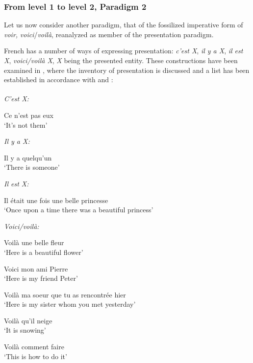 \documentclass[output=paper]{langsci/langscibook}
\begin{document}
\subsubsection{From level 1 to level 2, Paradigm 2} \label{kragh:4.1.2}


Let us now consider another paradigm, that of the fossilized imperative form of \textit{voir,} \textit{voici}/\textit{voilà}, reanalyzed as member of the presentation paradigm.  

French has a number of ways of expressing presentation: \textit{c’est X}, \textit{il y a X}, \textit{il est X}, \textit{voici/voilà X}, \textit{X} being the presented entity. These constructions have been examined in \citet{KraghSchosler2019}, where the inventory of presentation is discussed and a list has been established in accordance with \citet{Lambrecht2000, Lambrecht2001} and \citet{RiegelEtAl2009}:\\\\
\noindent\textit{C’est X:}

\begin{exe}
    \ex \label{ex:kragh:13} Ce n’est pas eux\\
    ‘It’s not them’
\end{exe}

\noindent\textit{Il y a X:}

\begin{exe}
    \ex \label{ex:kragh:14} Il y a quelqu’un\\
    ‘There is someone’
\end{exe}

\noindent\textit{Il est X:}

\begin{exe}
    \ex \label{ex:kragh:15} Il était une fois une belle princesse\\
    ‘Once upon a time there was a beautiful princess’
\end{exe}

\noindent\textit{Voici/voilà:}

\begin{exe}
    \ex \label{ex:kragh:16} Voilà une belle fleur\\
    ‘Here is a beautiful flower’

    \ex \label{ex:kragh:17} Voici mon ami Pierre\\
    ‘Here is my friend Peter’

    \ex \label{ex:kragh:18} Voilà ma soeur que tu as rencontrée hier\\
    ‘Here is my sister whom you met yesterday’

    \ex \label{ex:kragh:19} Voilà qu’il neige\\
    ‘It is snowing’
    
    \ex \label{ex:kragh:20} Voilà comment faire\\
    ‘This is how to do it'
\end{exe}
\end{document}

